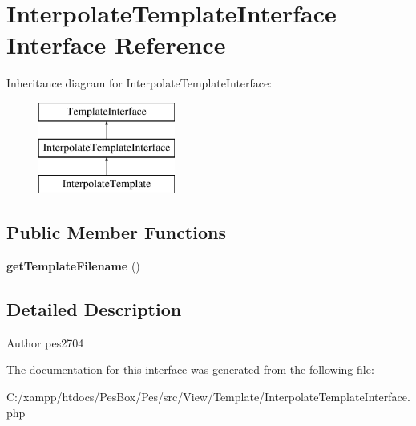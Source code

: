 \hypertarget{interface_pes_1_1_view_1_1_template_1_1_interpolate_template_interface}{}\section{Interpolate\+Template\+Interface Interface Reference}
\label{interface_pes_1_1_view_1_1_template_1_1_interpolate_template_interface}
Inheritance diagram for Interpolate\+Template\+Interface\+:\begin{figure}[H]
\begin{center}
\leavevmode
\includegraphics[height=3.000000cm]{interface_pes_1_1_view_1_1_template_1_1_interpolate_template_interface}
\end{center}
\end{figure}
\subsection*{Public Member Functions}
\begin{DoxyCompactItemize}
\item 
\mbox{\label{interface_pes_1_1_view_1_1_template_1_1_interpolate_template_interface_a487e0913fe1ce30f7cc6e1091abf6fdd}} 
{\bfseries get\+Template\+Filename} ()
\end{DoxyCompactItemize}


\subsection{Detailed Description}
\begin{DoxyAuthor}{Author}
pes2704 
\end{DoxyAuthor}


The documentation for this interface was generated from the following file\+:\begin{DoxyCompactItemize}
\item 
C\+:/xampp/htdocs/\+Pes\+Box/\+Pes/src/\+View/\+Template/Interpolate\+Template\+Interface.\+php\end{DoxyCompactItemize}
